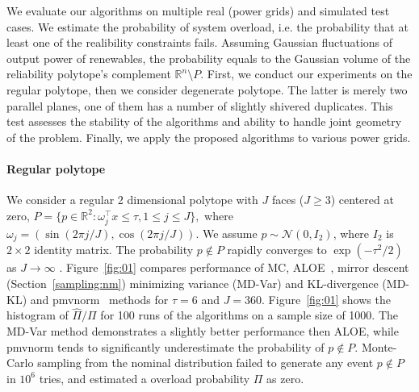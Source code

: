 We evaluate our algorithms on multiple real (power grids) and simulated test cases. We estimate the probability of system overload, i.e. the probability that at least one of the realibility constraints fails. Assuming Gaussian fluctuations of output power of renewables, the  probability equals to the Gaussian volume of the reliability polytope's complement $\mathbb{R}^n\setminus P$.%
First, we conduct our experiments on the regular polytope, then we consider degenerate polytope. The latter is merely two parallel planes, one of them has a number of slightly shivered duplicates. This test assesses the stability of the algorithms and ability to handle joint geometry of the problem. Finally, we apply the proposed algorithms to various power grids. 

\paragraph{Regular polytope}
We consider a regular 2 dimensional polytope with $J$ faces ($J\ge 3$) centered at zero, $
    P = \{p \in \mathbb{R}^2: \omega_j^\top x \leq \tau, 1\le j \le J\},
$
where $\omega_j = (\sin(2\pi j/J), \cos(2 \pi j/J))$. 
We assume $p\sim\mathcal{N}(0, I_2)$, where $I_2$ is $2\times 2$ identity matrix. The probability $p\not\in P$ rapidly converges to $\exp(-\tau^2/2)$ as $J\to\infty$ \cite{owen2019importance}. %
Figure~\ref{fig:01} compares performance of MC,  ALOE~\cite{owen2019importance}, mirror descent (Section~\ref{sampling:nm}) minimizing variance (MD-Var) and KL-divergence (MD-KL) and pmvnorm~\cite{genz2020package} methods for $\tau = 6$ and $J = 360$. Figure~\ref{fig:01} shows the histogram of $\hat \Pi/\Pi$ for 100 runs of the algorithms on a sample size of 1000. %
 The MD-Var method demonstrates a slightly better performance then ALOE, while pmvnorm tends to significantly underestimate the probability of $p\not\in P$. Monte-Carlo sampling from the nominal distribution failed to generate any event $p\not\in P$ in $10^6$ tries, and estimated a overload probability $\Pi$ as zero.

